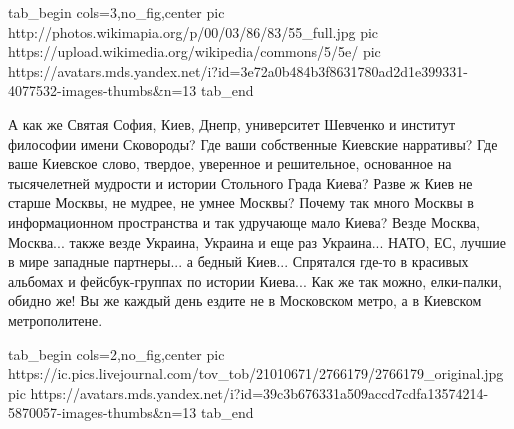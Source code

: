 \ifcmt
  tab_begin cols=3,no_fig,center
     pic http://photos.wikimapia.org/p/00/03/86/83/55_full.jpg
		 pic https://upload.wikimedia.org/wikipedia/commons/5/5e/%
		 pic https://avatars.mds.yandex.net/i?id=3e72a0b484b3f8631780ad2d1e399331-4077532-images-thumbs&n=13 
  tab_end
\fi

А как же Святая София, Киев, Днепр, университет Шевченко и институт
философии имени Сковороды? Где ваши собственные Киевские нарративы? Где ваше
Киевское слово, твердое, уверенное и решительное, основанное на тысячелетней
мудрости и истории Стольного Града Киева? Разве ж Киев не старше Москвы, не
мудрее, не умнее Москвы?  Почему так много Москвы в информационном пространства
и так удручающе мало Киева? Везде Москва, Москва... также везде Украина,
Украина и еще раз Украина... НАТО, ЕС, лучшие в мире западные партнеры...  а
бедный Киев... Спрятался где-то в красивых альбомах и фейсбук-группах по
истории Киева... Как же так можно, елки-палки, обидно же! Вы же каждый день
ездите не в Московском метро, а в Киевском метрополитене.

\ifcmt
  tab_begin cols=2,no_fig,center
		 pic https://ic.pics.livejournal.com/tov_tob/21010671/2766179/2766179_original.jpg
		 pic https://avatars.mds.yandex.net/i?id=39c3b676331a509accd7cdfa13574214-5870057-images-thumbs&n=13
  tab_end
\fi


